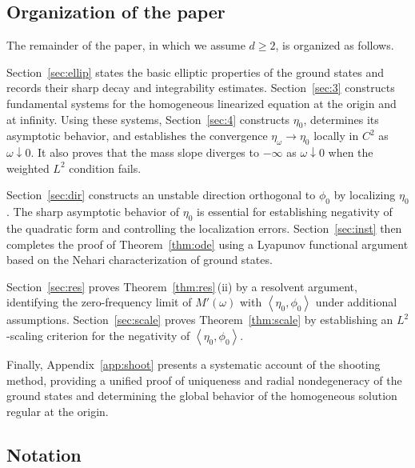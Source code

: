 \documentclass[12pt, a4paper, reqno]{amsart}
\numberwithin{equation}{section}
\theoremstyle{definition}
\theoremstyle{remark}
\def\tbra[#1,#2]{{\left\langle #1,#2\right\rangle}}
\begin{document}
\subsection{Organization of the paper}

The remainder of the paper, in which we assume $d\ge2$,
is organized as follows.

Section~\ref{sec:ellip} states the basic elliptic properties of the
ground states and records their sharp decay and integrability estimates.
Section~\ref{sec:3} constructs fundamental systems for the homogeneous
linearized equation at the origin and at infinity.
Using these systems, Section~\ref{sec:4} constructs $\eta_0$,
determines its asymptotic behavior, and establishes the convergence
$\eta_\omega\to\eta_0$ locally in $C^2$ as $\omega\downarrow0$.
It also proves that the mass slope diverges to $-\infty$ as
$\omega\downarrow0$ when the weighted $L^2$ condition fails.

Section~\ref{sec:dir} constructs an unstable direction orthogonal to
$\phi_0$ by localizing $\eta_0$.
The sharp asymptotic behavior of $\eta_0$ is essential for
establishing negativity of the quadratic form and controlling
the localization errors.
Section~\ref{sec:inst} then completes the proof of
Theorem~\ref{thm:ode} using a Lyapunov functional argument
based on the Nehari characterization of ground states.

Section~\ref{sec:res} proves Theorem~\ref{thm:res}\,\textup{(ii)} by a resolvent
argument, identifying the zero-frequency limit of $M'(\omega)$
with $\tbra[\eta_0,\phi_0]$ under additional assumptions.
Section~\ref{sec:scale} proves Theorem~\ref{thm:scale}
by establishing an $L^2$-scaling criterion for the negativity
of $\tbra[\eta_0,\phi_0]$.

Finally, Appendix~\ref{app:shoot} presents a systematic account of
the shooting method, providing a unified proof of uniqueness and
radial nondegeneracy of the ground states and determining the global
behavior of the homogeneous solution regular at the origin.

\subsection*{Notation}
\end{document}
